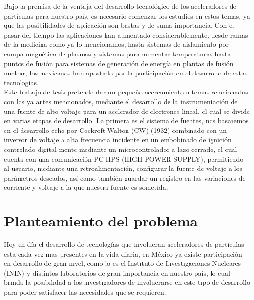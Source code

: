 Bajo la premisa de la ventaja del desarrollo tecnológico de los aceleradores de partículas para nuestro país, es necesario comenzar los estudios en estos temas, ya que las posibilidades de aplicación son bastas y de suma importancia. Con el pasar del tiempo las aplicaciones han aumentado considerablemente, desde ramas de la medicina como ya lo mencionamos, hasta sistemas de aislamiento por campo magnético de plasmas y sistemas para aumentar temperaturas hasta puntos de fusión para sistemas de generación de energía en plantas de fusión nuclear, los mexicanos han apostado por la participación en el desarrollo de estas tecnologías.\\

Este trabajo de tesis pretende dar un pequeño acercamiento a temas relacionados con los ya antes mencionados, mediante el desarrollo de la instrumentación de una fuente de alto voltaje para un acelerador de electrones lineal, el cual se divide en varias etapas de desarrollo. La primera es el sistema de fuentes, nos basaremos en el desarrollo echo por Cockroft-Walton (CW) (1932) combinado con un inversor de voltaje a alta frecuencia incidente en un embobinado de ignición controlado digital mente mediante un microcontrolador a lazo cerrado, el cual cuenta con una comunicación PC-HPS (HIGH POWER SUPPLY), permitiendo al usuario, mediante una retroalimentación, configurar la fuente de voltaje a los parámetros deseados, así como también guardar un registro en las variaciones de corriente y voltaje a la que nuestra fuente es sometida. \\
\newpage



\section{Planteamiento del problema}
Hoy en día el desarrollo de tecnologías que involucran aceleradores de partículas esta cada vez mas presentes en la vida diaria, en México ya existe participación en desarrollo de gran nivel, como lo es el Instituto de Investigaciones Nucleares (ININ) y distintos laboratorios de gran importancia en nuestro país, lo cual brinda la posibilidad a los investigadores de involucrarse en este tipo de desarrollo para poder satisfacer las necesidades
que se requieren.\\

